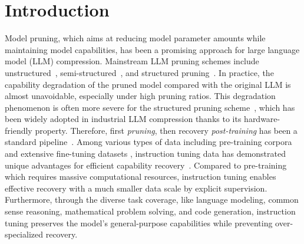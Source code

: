 \section{Introduction}
\label{sec:intro}
Model pruning, which aims at reducing model parameter amounts while maintaining model capabilities, has been a promising approach for large language model (LLM) compression. Mainstream LLM pruning schemes include unstructured~\citep{sparsegpt2023elias}, semi-structured~\citep{wanda2024mingjie}, and structured pruning~\citep{ma2023llm}. In practice, the capability degradation of the pruned model compared with the original LLM is almost unavoidable, especially under high pruning ratios. This degradation phenomenon is often more severe for the structured pruning scheme~\citep{dong2024prompt}, which has been widely adopted in industrial LLM compression thanks to its hardware-friendly property. Therefore, first \textit{pruning}, then recovery \textit{post-training} has been a standard pipeline~\citep{ma2023llm, zhaolora}.
Among various types of data including pre-training corpora and extensive fine-tuning datasets \citep{sheared2024mengzhou, wanda2024mingjie}, instruction tuning data has demonstrated unique advantages for efficient capability recovery~\citep{ma2023llm, zhaolora, zhang2024loraprune, chen2023lorashear}. Compared to pre-training which requires massive computational resources, instruction tuning enables effective recovery with a much smaller data scale by explicit supervision. Furthermore, through the diverse task coverage, like language modeling, common sense reasoning, mathematical problem solving, and code generation, instruction tuning preserves the model's general-purpose capabilities while preventing over-specialized recovery.



